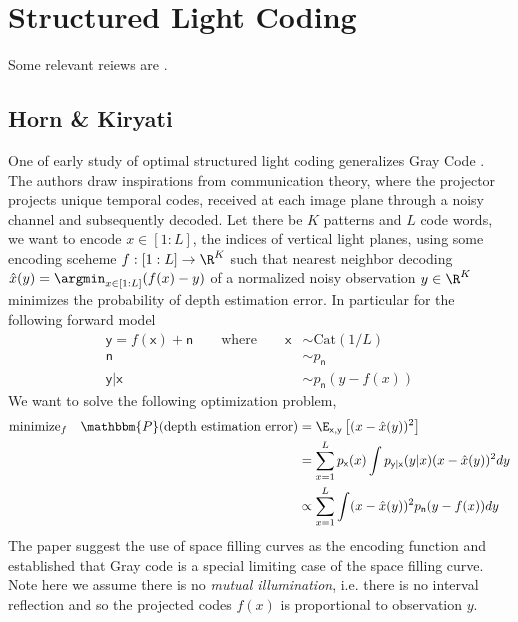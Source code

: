 \documentclass[11pt]{article}
\newcommand\ry{\ensuremath{\mathsf{y}}}
\newcommand\rx{\ensuremath{\mathsf{x}}}
\newcommand\rn{\ensuremath{\mathsf{n}}}
\begin{document}
\section{Structured Light Coding}

Some relevant reiews are \cite{salviPatternCodificationStrategies2004}.


\subsection{Horn \& Kiryati}

One of early study of optimal structured light coding \cite{hornOptimalStructuredLight1997} generalizes Gray Code \cite{satoThreedimensionalSurfaceMeasurement1985}. The authors draw inspirations from communication theory, where the projector projects unique temporal codes, received at each image plane through a noisy channel and subsequently decoded. Let there be $K$ patterns and $L$ code words, we want to encode $x\in [1:L]$, the indices of vertical light planes, using some encoding sceheme $f:[1:L] \to \R^K$ such that nearest neighbor decoding $\hat{x}(y) = \argmin_{x\in [1:L]} ( f(x)-y )$ of a normalized noisy observation $y\in\R^K$ minimizes the probability of depth estimation error. In particular for the following forward model 
\begin{align*}
    \ry = f(\rx) + \rn
    \quad\quad\text{where}\quad\quad
    \rx 
        &\sim \text{Cat}(1/L) \\
    \rn
        &\sim p_{\rn} \\
    \ry|\rx
        &\sim p_{\rn}(y - f(x))
\end{align*}
We want to solve the following optimization problem,
\begin{align*}
    \text{minimize}_{f}\quad \mathbbm{P}(\text{depth estimation error})
        &= \E_{\rx,\ry} \left[ (x-\hat{x}(y))^2 \right] \\
        &= \sum_{x=1}^L p_{\rx}(x) \int p_{\ry|\rx}(y|x) (x - \hat{x}(y))^2 dy \\
        &\propto \sum_{x=1}^L \int (x-\hat{x}(y))^2 p_{\rn}(y-f(x)) dy
\end{align*}
The paper suggest the use of space filling curves as the encoding function and established that Gray code is a special limiting case of the space filling curve. Note here we assume there is no \textit{mutual illumination}, i.e. there is no interval reflection and so the projected codes $f(x)$ is proportional to observation $y$.


\newpage
\printbibliography
\end{document}
